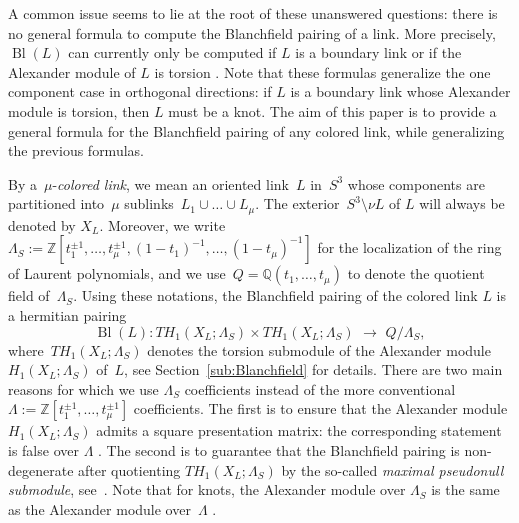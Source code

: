 \documentclass[11pt,a4paper]{amsart}
\theoremstyle{definition}
\newcommand{\Z}{\mathbb{Z}}
\newcommand{\sm}{\setminus}
\def\op{\operatorname}
\begin{document}
A common issue seems to lie at the root of these unanswered questions: there is no general formula to compute the Blanchfield pairing of a link. More precisely, $\op{Bl}(L)$ can currently only be computed if $L$ is a boundary link \cite{HillmanAlexanderIdeals, CochranOrr} or if the Alexander module of $L$ is torsion \cite{ConwayFriedlToffoli}. Note that these formulas generalize the one component case in orthogonal directions: if $L$ is a boundary link whose Alexander module is torsion, then $L$ must be a knot. The aim of this paper is to provide a general formula for the Blanchfield pairing of any colored link, while generalizing the previous formulas.


\medskip
By a~$\mu$-{\em colored link\/}, we mean an oriented link~$L$ in~$S^3$ whose components are partitioned into~$\mu$ sublinks~$L_1\cup\dots\cup L_\mu$. The exterior~$S^3\sm \nu L$ of $L$ will always be denoted by $X_L$. Moreover, we write~$\Lambda_S:=\mathbb{Z}[t_1^{\pm1},\dots,t_\mu^{\pm 1},(1-t_1)^{-1},\dots,(1-t_\mu)^{-1}]$ for the localization of the ring of Laurent polynomials, and we use~$Q=\mathbb{Q}(t_1,\dots,t_\mu)$ to denote the quotient field of~$\Lambda_S$. Using these notations, the Blanchfield pairing of the colored link $L$ is a hermitian pairing
$$ \op{Bl}(L)\colon TH_1(X_L;\Lambda_S) \times TH_1(X_L;\Lambda_S) \,\,\rightarrow\,\, Q/\Lambda_S,$$
where~$TH_1(X_L;\Lambda_S)$ denotes the torsion submodule of the Alexander module $H_1(X_L;\Lambda_S)$ of~$L$, see Section~\ref{sub:Blanchfield} for details. There are two main reasons for which we use $\Lambda_S$ coefficients instead of the more conventional $\Lambda:=\Z[t_1^{\pm1},\dots,t_\mu^{\pm 1}]$ coefficients. The first is to ensure that the Alexander module $H_1(X_L;\Lambda_S)$ admits a square presentation matrix: the corresponding statement is false over $\Lambda$ \cite{CrowellStrauss, Hillman}. The second is to guarantee that  the Blanchfield pairing is non-degenerate after quotienting $TH_1(X_L;\Lambda_S)$ by the so-called \emph{maximal pseudonull submodule}, see~\cite{Hillman}. Note that for knots, the Alexander module over $\Lambda_S$ is the same as the Alexander module over~$\Lambda$ \cite[Proposition 1.2]{Levine}.
\end{document}
